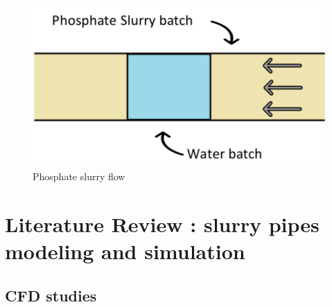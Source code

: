 \documentclass[review,3p,times,12pt]{elsarticle}
\begin{document}
\begin{figure}[h!]
\begin{center}
%
\includegraphics[trim=0cm 0cm 0cm 0cm,clip,scale= 0.5]{figs/batch.png}
\caption{Phosphate slurry flow}
\label{fig:gauss}
\end{center}
\end{figure} 
\section{Literature Review : slurry pipes modeling and simulation}
\subsection{CFD studies}
\end{document}
